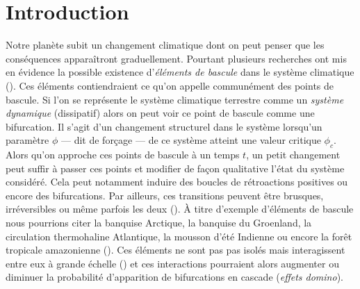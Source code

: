 \section{Introduction}

Notre planète subit un changement climatique dont on peut penser que les conséquences apparaîtront graduellement. Pourtant plusieurs recherches ont mis en évidence la possible existence d'\emph{éléments de bascule} dans le système climatique (\cite{lenton_tipping_2008,Lenton_2012}). Ces éléments contiendraient ce qu'on appelle communément des points de bascule. Si l'on se représente le système climatique terrestre comme un \emph{système dynamique} (dissipatif) alors on peut voir ce point de bascule comme une bifurcation. Il s'agit d'un changement structurel dans le système lorsqu'un paramètre $\phi$ --- dit de forçage --- de ce système atteint une valeur critique $\phi_c$. Alors qu'on approche ces points de bascule à un temps $t$, un petit changement peut suffir à passer ces points et modifier de façon qualitative l'état du système considéré. Cela peut notamment induire des boucles de rétroactions positives ou encore des bifurcations. Par ailleurs, ces transitions peuvent être brusques, irréversibles ou même parfois les deux (\cite{Lenton_2012}). À titre d'exemple d'éléments de bascule nous pourrions citer la banquise Arctique, la banquise du Groenland, la circulation thermohaline Atlantique, la mousson d'été Indienne ou encore la forêt tropicale amazonienne (\cite{lenton_tipping_2008, thompson_predicting_2011}). Ces éléments ne sont pas pas isolés mais interagissent entre eux à grande échelle (\cite{lenton_climate_2019_too_risky}) et ces interactions pourraient alors augmenter ou diminuer la probabilité d'apparition de bifurcations en cascade (\emph{effets domino}).

